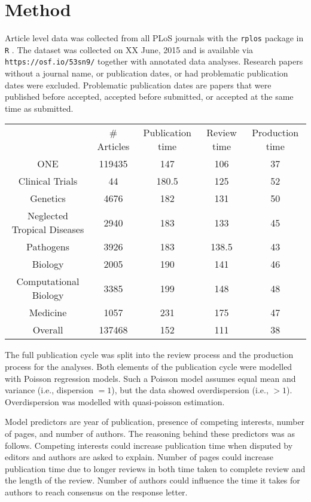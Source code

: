 \section*{Method}
Article level data was collected from all PLoS journals with the \texttt{rplos} package \cite[v0.4.7][]{rplos} in \texttt{R} \cite[v3.2.0][]{rcran}. The dataset was collected on XX June, 2015 and is available via \texttt{https://osf.io/53sn9/} together with annotated data analyses. Research papers without a journal name, or publication dates, or had problematic publication dates were excluded. Problematic publication dates are papers that were published before accepted, accepted before submitted, or accepted at the same time as submitted.

\begin{tabular}{ c c c c c }
          & \# Articles & Publication time & Review time & Production time \\
    ONE   & 119435 & 147   & 106   & 37 \\
    Clinical Trials & 44    & 180.5 & 125   & 52 \\
    Genetics & 4676  & 182   & 131   & 50 \\
    Neglected Tropical Diseases & 2940  & 183   & 133   & 45 \\
    Pathogens & 3926  & 183   & 138.5 & 43 \\
    Biology & 2005  & 190   & 141   & 46 \\
    Computational Biology & 3385  & 199   & 148   & 48 \\
    Medicine & 1057  & 231   & 175   & 47 \\
    Overall & 137468 & 152   & 111   & 38 \\
\end{tabular}

The full publication cycle was split into the review process and the production process for the analyses. Both elements of the publication cycle were modelled with Poisson regression models. Such a Poisson model assumes equal mean and variance (i.e., dispersion $=1$), but the data showed overdispersion (i.e., $>1$). Overdispersion was modelled with quasi-poisson estimation.

Model predictors are year of publication, presence of competing interests, number of pages, and number of authors. The reasoning behind these predictors was as follows. Competing interests could increase publication time when disputed by editors and authors are asked to explain. Number of pages could increase publication time due to longer reviews in both time taken to complete review and the length of the review. Number of authors could influence the time it takes for authors to reach consensus on the response letter. 

